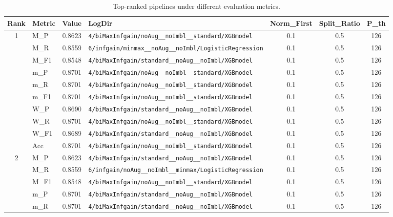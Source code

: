 \begin{table}[htbp]
\caption{Top-ranked pipelines under different evaluation metrics.}
\label{tab:rank_metric_vertical}
\centering
\small
\setlength{\tabcolsep}{4pt}
\begin{tabular}{|c|l|c|>{\ttfamily\footnotesize}p{7.2cm}|c|c|c|}
\hline
Rank & Metric & Value & LogDir & Norm\_First & Split\_Ratio & P\_th \\
\hline
\multirow{10}{*}{1} & M\_P & 0.8623 & \texttt{4/biMaxInfgain/noAug\_\_noImbl\_\_standard/XGBmodel} & 0.1 & 0.5  & 126 \\ 
 & M\_R & 0.8559 & \texttt{6/infgain/minmax\_\_noAug\_\_noImbl/LogisticRegression} & 0.1 & 0.5  & 126 \\ 
 & M\_F1 & 0.8548 & \texttt{4/biMaxInfgain/standard\_\_noAug\_\_noImbl/XGBmodel} & 0.1 & 0.5  & 126 \\ 
 & m\_P & 0.8701 & \texttt{4/biMaxInfgain/noAug\_\_noImbl\_\_standard/XGBmodel} & 0.1 & 0.5  & 126 \\ 
 & m\_R & 0.8701 & \texttt{4/biMaxInfgain/noAug\_\_noImbl\_\_standard/XGBmodel} & 0.1 & 0.5  & 126 \\ 
 & m\_F1 & 0.8701 & \texttt{4/biMaxInfgain/noAug\_\_noImbl\_\_standard/XGBmodel} & 0.1 & 0.5  & 126 \\ 
 & W\_P & 0.8690 & \texttt{4/biMaxInfgain/standard\_\_noAug\_\_noImbl/XGBmodel} & 0.1 & 0.5  & 126 \\ 
 & W\_R & 0.8701 & \texttt{4/biMaxInfgain/noAug\_\_noImbl\_\_standard/XGBmodel} & 0.1 & 0.5  & 126 \\ 
 & W\_F1 & 0.8689 & \texttt{4/biMaxInfgain/standard\_\_noAug\_\_noImbl/XGBmodel} & 0.1 & 0.5  & 126 \\ 
 & Acc & 0.8701 & \texttt{4/biMaxInfgain/noAug\_\_noImbl\_\_standard/XGBmodel} & 0.1 & 0.5  & 126 \\ 
\hline
\multirow{10}{*}{2} & M\_P & 0.8623 & \texttt{4/biMaxInfgain/standard\_\_noAug\_\_noImbl/XGBmodel} & 0.1 & 0.5  & 126 \\ 
 & M\_R & 0.8559 & \texttt{6/infgain/noAug\_\_noImbl\_\_minmax/LogisticRegression} & 0.1 & 0.5  & 126 \\ 
 & M\_F1 & 0.8548 & \texttt{4/biMaxInfgain/noAug\_\_noImbl\_\_standard/XGBmodel} & 0.1 & 0.5  & 126 \\ 
 & m\_P & 0.8701 & \texttt{4/biMaxInfgain/standard\_\_noAug\_\_noImbl/XGBmodel} & 0.1 & 0.5  & 126 \\ 
 & m\_R & 0.8701 & \texttt{4/biMaxInfgain/standard\_\_noAug\_\_noImbl/XGBmodel} & 0.1 & 0.5  & 126 \\ 

\end{tabular}
\end{table}
